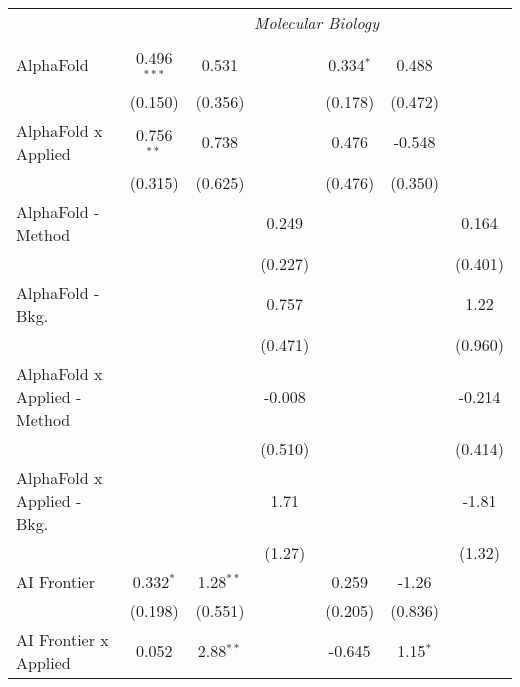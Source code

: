 \begin{tabular}{lcccccc}
 & \multicolumn{6}{c}{\textit{Molecular Biology}} \\ \\
   AlphaFold                      & 0.496$^{***}$ & 0.531         &               & 0.334$^{*}$   & 0.488         &   \\   
                                  & (0.150)       & (0.356)       &               & (0.178)       & (0.472)       &   \\   
   AlphaFold x Applied            & 0.756$^{**}$  & 0.738         &               & 0.476         & -0.548        &   \\   
                                  & (0.315)       & (0.625)       &               & (0.476)       & (0.350)       &   \\   
   AlphaFold - Method             &               &               & 0.249         &               &               & 0.164\\   
                                  &               &               & (0.227)       &               &               & (0.401)\\   
   AlphaFold - Bkg.               &               &               & 0.757         &               &               & 1.22\\   
                                  &               &               & (0.471)       &               &               & (0.960)\\   
   AlphaFold x Applied - Method   &               &               & -0.008        &               &               & -0.214\\   
                                  &               &               & (0.510)       &               &               & (0.414)\\   
   AlphaFold x Applied - Bkg.     &               &               & 1.71          &               &               & -1.81\\   
                                  &               &               & (1.27)        &               &               & (1.32)\\   
   AI Frontier                    & 0.332$^{*}$   & 1.28$^{**}$   &               & 0.259         & -1.26         &   \\   
                                  & (0.198)       & (0.551)       &               & (0.205)       & (0.836)       &   \\   
   AI Frontier x Applied          & 0.052         & 2.88$^{**}$   &               & -0.645        & 1.15$^{*}$    &   \\   

\end{tabular}

